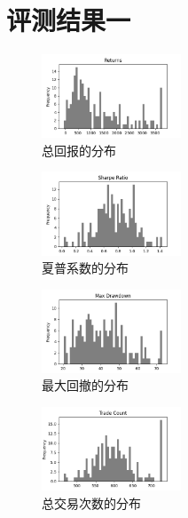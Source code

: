 \documentclass[final,5p,times,twocolumn,authoryear]{elsarticle}
\begin{document}
\appendix
\newpage

\section{评测结果一}
\label{sec:performance1}
\begin{figure}[h!]
       \centering
       \includegraphics[width=0.37\textwidth]{img/1/Returns.png} %
       \caption{总回报的分布} %
\end{figure}
\begin{figure}[h!]
       \centering
       \includegraphics[width=0.37\textwidth]{img/1/Sharpe Ratio.png} %
       \caption{夏普系数的分布} %
\end{figure}
\begin{figure}[h!]
       \centering
       \includegraphics[width=0.37\textwidth]{img/1/Max Drawdown.png} %
       \caption{最大回撤的分布} %
\end{figure}
\begin{figure}[h!]
       \centering
       \includegraphics[width=0.37\textwidth]{img/1/Trade Count.png} %
       \caption{总交易次数的分布} %
\end{figure}
\end{document}
